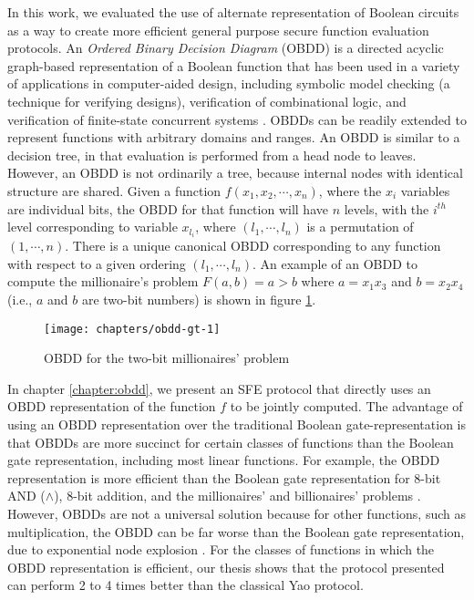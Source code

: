 In this work, we evaluated the use of alternate representation of
Boolean circuits as a way to create more efficient general purpose
secure function evaluation protocols. An \emph{Ordered Binary Decision
Diagram} (OBDD) is a directed acyclic graph-based representation of
a Boolean function that has been used in a variety of applications
in computer-aided design, including symbolic model checking (a technique
for verifying designs), verification of combinational logic, and verification
of finite-state concurrent systems \cite{Bryant:BDD,Clarke:book}.
OBDDs can be readily extended to represent functions with arbitrary
domains and ranges. An OBDD is similar to a decision tree, in that
evaluation is performed from a head node to leaves. However, an OBDD
is not ordinarily a tree, because internal nodes with identical structure
are shared. Given a function $f(x_{1},x_{2},\cdots,x_{n})$, where the
$x_{i}$ variables are individual bits, the OBDD
for that function will have $n$ levels, with the $i^{th}$ level
corresponding to variable $x_{l_{i}}$, where $(l_{1},\cdots,l_{n})$
is a permutation of $(1,\cdots,n)$. There is a unique canonical OBDD
corresponding to any function with respect to a given ordering $(l_{1},\cdots,l_{n})$.
An example of an OBDD to compute the millionaire's problem 
$F(a,b)=a>b$ where $a=x_1 x_3$ and $b=x_2 x_4$
(i.e., $a$ and $b$ are two-bit numbers) is shown in figure \ref{fig:obdd-gt-1}.

%
\begin{figure}
\begin{centering}
\texttt{[image: chapters/obdd-gt-1]} 
\par\end{centering}
\caption{\label{fig:obdd-gt-1}OBDD for the two-bit millionaires' problem}
\end{figure}


In chapter \ref{chapter:obdd}, we present an SFE protocol that directly uses
an OBDD representation of the function $f$ to be jointly computed.
The advantage of using an OBDD representation over the traditional Boolean gate-representation
is that OBDDs are more succinct for certain classes of functions than
the Boolean gate representation, including most linear functions.
For example, the OBDD representation is more efficient than the Boolean
gate representation for 8-bit AND ($\wedge$), 8-bit addition, and the millionaires'
and billionaires' problems \cite{Yao86}.  However, OBDDs are not a universal
solution because for other functions, such as multiplication, the
OBDD can be far worse than the Boolean gate representation, due to
exponential node explosion \cite{Bryant:BDD}. For the classes of
functions in which the OBDD representation is efficient, our thesis
shows that the protocol presented can perform
2 to 4 times better than the classical Yao protocol.

